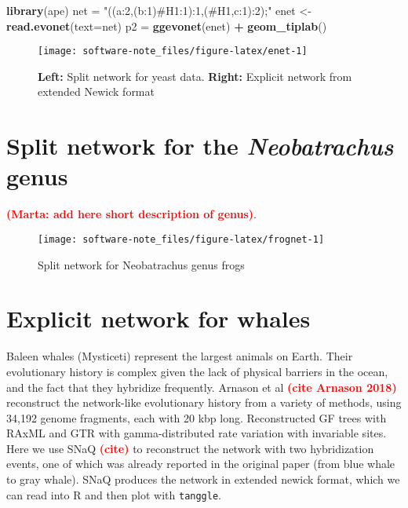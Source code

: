 \documentclass[]{article}
\newenvironment{Shaded}{\begin{snugshade}}{\end{snugshade}}
\newcommand{\DataTypeTok}[1]{\textcolor[rgb]{0.13,0.29,0.53}{#1}}
\newcommand{\KeywordTok}[1]{\textcolor[rgb]{0.13,0.29,0.53}{\textbf{#1}}}
\newcommand{\NormalTok}[1]{#1}
\newcommand{\OperatorTok}[1]{\textcolor[rgb]{0.81,0.36,0.00}{\textbf{#1}}}
\newcommand{\StringTok}[1]{\textcolor[rgb]{0.31,0.60,0.02}{#1}}
\begin{document}
\begin{Shaded}
\begin{Highlighting}[]
\KeywordTok{library}\NormalTok{(ape)}
\NormalTok{net =}\StringTok{ "((a:2,(b:1)#H1:1):1,(#H1,c:1):2);"}
\NormalTok{enet <-}\StringTok{ }\KeywordTok{read.evonet}\NormalTok{(}\DataTypeTok{text=}\NormalTok{net)}
\NormalTok{p2 =}\StringTok{ }\KeywordTok{ggevonet}\NormalTok{(enet) }\OperatorTok{+}\StringTok{ }\KeywordTok{geom_tiplab}\NormalTok{() }
\end{Highlighting}
\end{Shaded}

\begin{figure}[H]

{\centering \texttt{[image: software-note\_files/figure-latex/enet-1]} 

}

\caption{\textbf{Left:} Split network for yeast data. \textbf{Right:} Explicit network from extended Newick format}\label{fig:enet}
\end{figure}

\hypertarget{split-network-for-the-neobatrachus-genus}{%
\section{\texorpdfstring{Split network for the \emph{Neobatrachus}
genus}{Split network for the Neobatrachus genus}}\label{split-network-for-the-neobatrachus-genus}}

\textcolor{red}{\textbf{(Marta: add here short description of genus)}}.

\begin{figure}[H]

{\centering \texttt{[image: software-note\_files/figure-latex/frognet-1]} 

}

\caption{Split network for Neobatrachus genus frogs}\label{fig:frognet}
\end{figure}

\hypertarget{explicit-network-for-whales}{%
\section{Explicit network for
whales}\label{explicit-network-for-whales}}

Baleen whales (Mysticeti) represent the largest animals on Earth. Their
evolutionary history is complex given the lack of physical barriers in
the ocean, and the fact that they hybridize frequently. Arnason et al
\textcolor{red}{\textbf{(cite Arnason 2018)}} reconstruct the
network-like evolutionary history from a variety of methods, using
34,192 genome fragments, each with 20 kbp long. Reconstructed GF trees
with RAxML and GTR with gamma-distributed rate variation with invariable
sites. Here we use SNaQ \textcolor{red}{\textbf{(cite)}} to reconstruct
the network with two hybridization events, one of which was already
reported in the original paper (from blue whale to gray whale). SNaQ
produces the network in extended newick format, which we can read into R
and then plot with \texttt{tanggle}.
\end{document}
